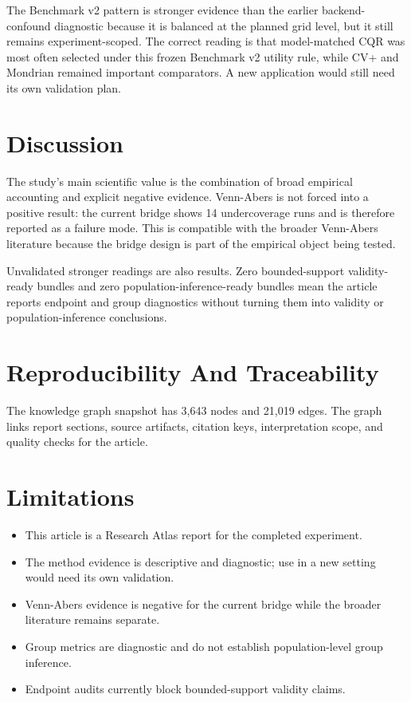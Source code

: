 \documentclass[11pt]{article}
\begin{document}
The Benchmark v2 pattern is stronger evidence than the earlier backend-confound diagnostic because it is balanced at the planned grid level, but it still remains experiment-scoped. The correct reading is that model-matched CQR was most often selected under this frozen Benchmark v2 utility rule, while CV+ and Mondrian remained important comparators. A new application would still need its own validation plan.

\section{Discussion}

The study's main scientific value is the combination of broad empirical accounting and explicit negative evidence. Venn-Abers is not forced into a positive result: the current bridge shows 14 undercoverage runs and is therefore reported as a failure mode. This is compatible with the broader Venn-Abers literature because the bridge design is part of the empirical object being tested.

Unvalidated stronger readings are also results. Zero bounded-support validity-ready bundles and zero population-inference-ready bundles mean the article reports endpoint and group diagnostics without turning them into validity or population-inference conclusions.

\section{Reproducibility And Traceability}

The knowledge graph snapshot has 3,643 nodes and 21,019 edges. The graph links report sections, source artifacts, citation keys, interpretation scope, and quality checks for the article.

\section{Limitations}

\begin{itemize}
\item This article is a Research Atlas report for the completed experiment.
\item The method evidence is descriptive and diagnostic; use in a new setting would need its own validation.
\item Venn-Abers evidence is negative for the current bridge while the broader literature remains separate.
\item Group metrics are diagnostic and do not establish population-level group inference.
\item Endpoint audits currently block bounded-support validity claims.
\end{itemize}
\end{document}

